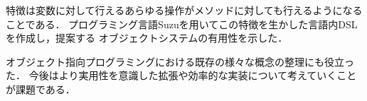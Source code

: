 \documentclass{ipsjprosym}
\begin{document}
特徴は変数に対して行えるあらゆる操作がメソッドに対しても行えるようになることである．
プログラミング言語Suzuを用いてこの特徴を生かした言語内DSLを作成し，提案する
オブジェクトシステムの有用性を示した．

オブジェクト指向プログラミングにおける既存の様々な概念の整理にも役立った．
今後はより実用性を意識した拡張や効率的な実装について考えていくことが課題である．





\end{document}
